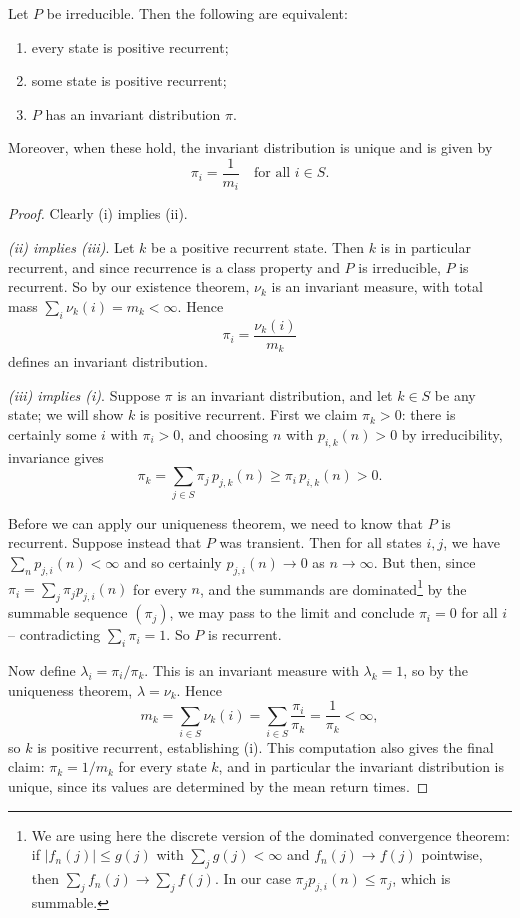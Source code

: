 \documentclass[a4paper]{scrartcl}
\begin{document}
\begin{theorem}
	Let $P$ be irreducible. Then the following are equivalent:
	\begin{enumerate}[label=(\roman*)]
		\item every state is positive recurrent;
		\item some state is positive recurrent;
		\item $P$ has an invariant distribution $\pi$.
	\end{enumerate}
	Moreover, when these hold, the invariant distribution is unique and is given by
	$$
	\pi_i = \frac{1}{m_i} \quad \text{for all } i \in S.
	$$
\end{theorem}
\begin{proof}
	Clearly (i) implies (ii).

	\emph{(ii) implies (iii)}. Let $k$ be a positive recurrent state. Then $k$ is in particular recurrent, and since recurrence is a class property and $P$ is irreducible, $P$ is recurrent. So by our existence theorem, $\nu_k$ is an invariant measure, with total mass
	$
	\sum_i \nu_k(i) = m_k < \infty.
	$
	Hence
	$$
	\pi_i = \frac{\nu_k(i)}{m_k}
	$$
	defines an invariant distribution.

	\emph{(iii) implies (i)}. Suppose $\pi$ is an invariant distribution, and let $k \in S$ be any state; we will show $k$ is positive recurrent. First we claim $\pi_k > 0$: there is certainly some $i$ with $\pi_i > 0$, and choosing $n$ with $p_{i, k}(n) > 0$ by irreducibility, invariance gives
	$$
	\pi_k = \sum_{j \in S} \pi_j \, p_{j, k}(n) \geq \pi_i \, p_{i, k}(n) > 0.
	$$

	Before we can apply our uniqueness theorem, we need to know that $P$ is recurrent. Suppose instead that $P$ was transient. Then for all states $i, j$, we have $\sum_n p_{j, i}(n) < \infty$ and so certainly $p_{j, i}(n) \rightarrow 0$ as $n \to \infty$. But then, since $\pi_i = \sum_j \pi_j p_{j, i}(n)$ for every $n$, and the summands are dominated\footnote{We are using here the discrete version of the dominated convergence theorem: if $|f_n(j)| \leq g(j)$ with $\sum_j g(j) < \infty$ and $f_n(j) \rightarrow f(j)$ pointwise, then $\sum_j f_n(j) \rightarrow \sum_j f(j)$. In our case $\pi_j p_{j, i}(n) \leq \pi_j$, which is summable.} by the summable sequence $(\pi_j)$, we may pass to the limit and conclude $\pi_i = 0$ for all $i$ -- contradicting $\sum_i \pi_i = 1$. So $P$ is recurrent.

	Now define $\lambda_i = \pi_i / \pi_k$. This is an invariant measure with $\lambda_k = 1$, so by the uniqueness theorem, $\lambda = \nu_k$. Hence
	$$
	m_k = \sum_{i \in S} \nu_k(i) = \sum_{i \in S} \frac{\pi_i}{\pi_k} = \frac{1}{\pi_k} < \infty,
	$$
	so $k$ is positive recurrent, establishing (i). This computation also gives the final claim: $\pi_k = 1/m_k$ for every state $k$, and in particular the invariant distribution is unique, since its values are determined by the mean return times.
\end{proof}
\end{document}
